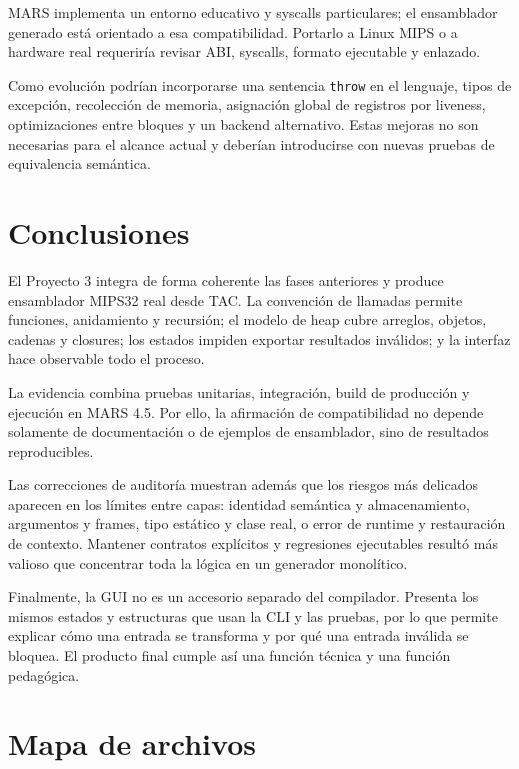 \documentclass[11pt,letterpaper,oneside]{report}
\newcommand{\codigo}[1]{\texttt{#1}}
\begin{document}
MARS implementa un entorno educativo y syscalls particulares; el ensamblador generado est\'a orientado a esa compatibilidad. Portarlo a Linux MIPS o a hardware real requerir\'ia revisar ABI, syscalls, formato ejecutable y enlazado.

Como evoluci\'on podr\'ian incorporarse una sentencia \codigo{throw} en el lenguaje, tipos de excepci\'on, recolecci\'on de memoria, asignaci\'on global de registros por liveness, optimizaciones entre bloques y un backend alternativo. Estas mejoras no son necesarias para el alcance actual y deber\'ian introducirse con nuevas pruebas de equivalencia sem\'antica.

\chapter{Conclusiones}

El Proyecto 3 integra de forma coherente las fases anteriores y produce ensamblador MIPS32 real desde TAC. La convenci\'on de llamadas permite funciones, anidamiento y recursi\'on; el modelo de heap cubre arreglos, objetos, cadenas y closures; los estados impiden exportar resultados inv\'alidos; y la interfaz hace observable todo el proceso.

La evidencia combina pruebas unitarias, integraci\'on, build de producci\'on y ejecuci\'on en MARS 4.5. Por ello, la afirmaci\'on de compatibilidad no depende solamente de documentaci\'on o de ejemplos de ensamblador, sino de resultados reproducibles.

Las correcciones de auditor\'ia muestran adem\'as que los riesgos m\'as delicados aparecen en los l\'imites entre capas: identidad sem\'antica y almacenamiento, argumentos y frames, tipo est\'atico y clase real, o error de runtime y restauraci\'on de contexto. Mantener contratos expl\'icitos y regresiones ejecutables result\'o m\'as valioso que concentrar toda la l\'ogica en un generador monol\'itico.

Finalmente, la GUI no es un accesorio separado del compilador. Presenta los mismos estados y estructuras que usan la CLI y las pruebas, por lo que permite explicar c\'omo una entrada se transforma y por qu\'e una entrada inv\'alida se bloquea. El producto final cumple as\'i una funci\'on t\'ecnica y una funci\'on pedag\'ogica.

\appendix
\chapter{Mapa de archivos}
\end{document}
